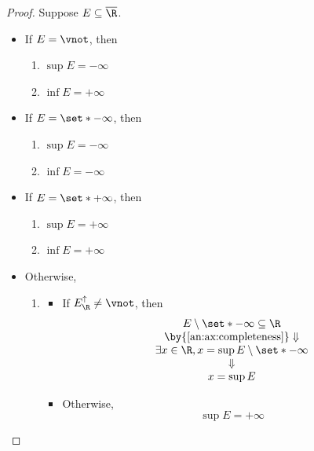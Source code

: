 \begin{proof}
  Suppose $E \subseteq \overline{\R}$.
  \begin{itemize}
    \item If $E = \vnot$, then
          \begin{enumerate}[label=\textbf{(\Alph*)}]
            \item $\sup E = - \infty$
            \item $\inf E = + \infty$
          \end{enumerate}
    \item If $E = \set*{- \infty}$, then
          \begin{enumerate}[label=\textbf{(\Alph*)}]
            \item $\sup E = - \infty$
            \item $\inf E = - \infty$
          \end{enumerate}
    \item If $E = \set*{+ \infty}$, then
          \begin{enumerate}[label=\textbf{(\Alph*)}]
            \item $\sup E = + \infty$
            \item $\inf E = + \infty$
          \end{enumerate}
    \item Otherwise,
          \begin{enumerate}[label=\textbf{(\Alph*)}]
            \item \begin{itemize}
                    \item If $E_{\R}^{\uparrow} \neq \vnot$, then
                          \[
                            \begin{array}{c}
                              E \setminus \set*{- \infty} \subseteq \R               \\
                              \by{\Cref{an:ax:completeness}} \Downarrow              \\
                              \exists x \in \R, x = \sup E \setminus \set*{- \infty} \\
                              \Downarrow                                             \\
                              x = \sup E
                            \end{array}
                          \]
                    \item Otherwise,
                          \[
                            \sup E = + \infty
\]
\end{itemize}
\end{enumerate}
\end{itemize}
\end{proof}

